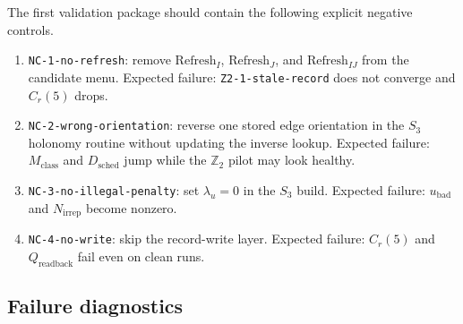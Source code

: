 \documentclass[11pt]{article}
\begin{document}
The first validation package should contain the following explicit negative controls.
\begin{enumerate}[leftmargin=2em]
\item \texttt{NC-1-no-refresh}: remove $\mathrm{Refresh}_I$, $\mathrm{Refresh}_J$, and
$\mathrm{Refresh}_{IJ}$ from the candidate menu. Expected failure:
\texttt{Z2-1-stale-record} does not converge and $C_r(5)$ drops.
\item \texttt{NC-2-wrong-orientation}: reverse one stored edge orientation in the $S_3$ holonomy
routine without updating the inverse lookup. Expected failure: $M_{\mathrm{class}}$ and
$D_{\mathrm{sched}}$ jump while the $\mathbb Z_2$ pilot may look healthy.
\item \texttt{NC-3-no-illegal-penalty}: set $\lambda_u=0$ in the $S_3$ build. Expected failure:
$u_{\mathrm{bad}}$ and $N_{\mathrm{irrep}}$ become nonzero.
\item \texttt{NC-4-no-write}: skip the record-write layer. Expected failure: $C_r(5)$ and
$Q_{\mathrm{readback}}$ fail even on clean runs.
\end{enumerate}

\subsection{Failure diagnostics}
\end{document}
